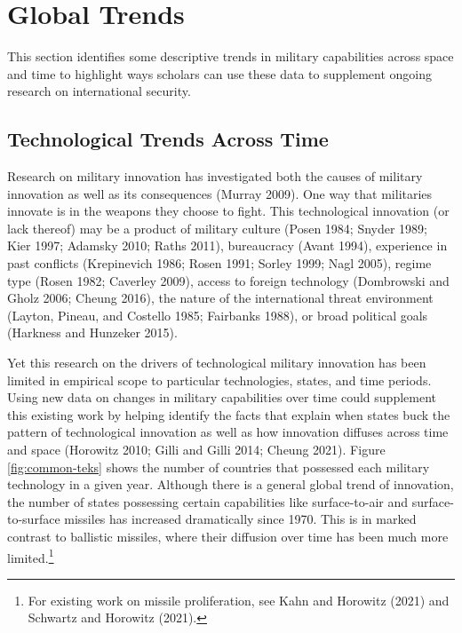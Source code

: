 \documentclass[
]{article}
\begin{document}
\hypertarget{global-trends}{%
\section{Global Trends}\label{global-trends}}

This section identifies some descriptive trends in military capabilities across space and time to highlight ways scholars can use these data to supplement ongoing research on international security.

\hypertarget{technological-trends-across-time}{%
\subsection{Technological Trends Across Time}\label{technological-trends-across-time}}

Research on military innovation has investigated both the causes of military innovation as well as its consequences (Murray 2009). One way that militaries innovate is in the weapons they choose to fight. This technological innovation (or lack thereof) may be a product of military culture (Posen 1984; Snyder 1989; Kier 1997; Adamsky 2010; Raths 2011), bureaucracy (Avant 1994), experience in past conflicts (Krepinevich 1986; Rosen 1991; Sorley 1999; Nagl 2005), regime type (Rosen 1982; Caverley 2009), access to foreign technology (Dombrowski and Gholz 2006; Cheung 2016), the nature of the international threat environment (Layton, Pineau, and Costello 1985; Fairbanks 1988), or broad political goals (Harkness and Hunzeker 2015).

Yet this research on the drivers of technological military innovation has been limited in empirical scope to particular technologies, states, and time periods. Using new data on changes in military capabilities over time could supplement this existing work by helping identify the facts that explain when states buck the pattern of technological innovation as well as how innovation diffuses across time and space (Horowitz 2010; Gilli and Gilli 2014; Cheung 2021). Figure \ref{fig:common-teks} shows the number of countries that possessed each military technology in a given year. Although there is a general global trend of innovation, the number of states possessing certain capabilities like surface-to-air and surface-to-surface missiles has increased dramatically since 1970. This is in marked contrast to ballistic missiles, where their diffusion over time has been much more limited.\footnote{For existing work on missile proliferation, see Kahn and Horowitz (2021) and Schwartz and Horowitz (2021).}
\end{document}
